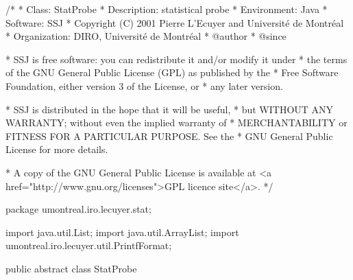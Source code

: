\begin{code}
\begin{hide}
/*
 * Class:        StatProbe
 * Description:  statistical probe
 * Environment:  Java
 * Software:     SSJ 
 * Copyright (C) 2001  Pierre L'Ecuyer and Université de Montréal
 * Organization: DIRO, Université de Montréal
 * @author       
 * @since

 * SSJ is free software: you can redistribute it and/or modify it under
 * the terms of the GNU General Public License (GPL) as published by the
 * Free Software Foundation, either version 3 of the License, or
 * any later version.

 * SSJ is distributed in the hope that it will be useful,
 * but WITHOUT ANY WARRANTY; without even the implied warranty of
 * MERCHANTABILITY or FITNESS FOR A PARTICULAR PURPOSE.  See the
 * GNU General Public License for more details.

 * A copy of the GNU General Public License is available at
   <a href="http://www.gnu.org/licenses">GPL licence site</a>.
 */
\end{hide}
package umontreal.iro.lecuyer.stat;\begin{hide}
import java.util.List;
import java.util.ArrayList;
import umontreal.iro.lecuyer.util.PrintfFormat;
\end{hide}

public abstract class StatProbe\begin{hide} { 

   private List<ObservationListener> listeners = new ArrayList<ObservationListener>();
   protected String name;
   protected double maxValue;
   protected double minValue;
   protected double sumValue;
   protected boolean collect = true;
   protected boolean broadcast = false;
   protected boolean showNobs = true;

\end{hide}
\end{code}

